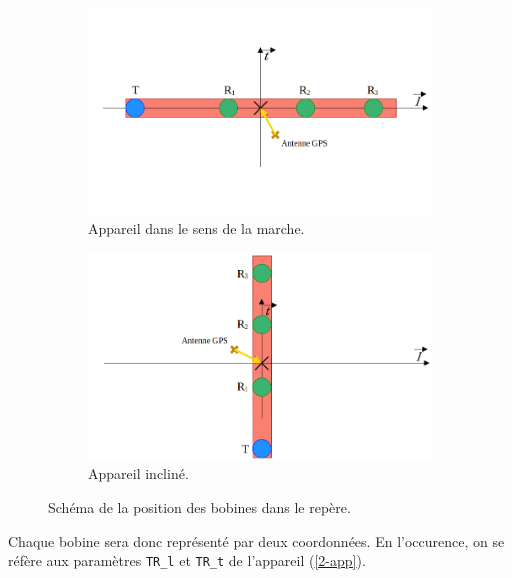 \documentclass[12pt]{article}
\begin{document}
    \begin{figure}[ht!]
        \centering
        \begin{subfigure}[b]{0.475\textwidth}
            \centering
            \includegraphics[width=\textwidth]{Images/SepVoies_Sch1.png}
            \caption[]%
            {{ \small Appareil dans le sens de la marche.}}    
        \end{subfigure}
        \hfill
        \begin{subfigure}[b]{0.475\textwidth}  
            \centering 
            \includegraphics[width=\textwidth]{Images/SepVoies_Sch2.png}
            \caption[]%
            {{\small Appareil incliné.}}    
        \end{subfigure}
        \caption{Schéma de la position des bobines dans le repère.}
    \end{figure}

    Chaque bobine sera donc représenté par deux coordonnées. En l'occurence, on se réfère aux paramètres \texttt{TR\_l} et \texttt{TR\_t} de l'appareil (\ref{2-app}).
\end{document}

